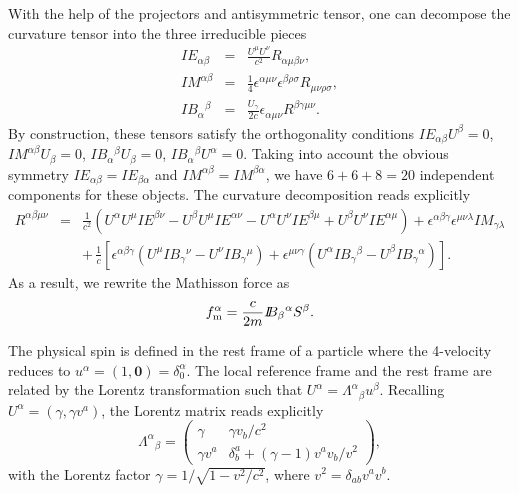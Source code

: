 \documentclass[preprint,showpacs,preprintnumbers,eqsecnum,amsmath,amssymb]{revtex4-1}
\newcommand{\dE}{I \! \! E}
\newcommand{\dB}{I \! \! B}
\newcommand{\dM}{I \! \! M}
\begin{document}
With the help of the projectors and antisymmetric tensor, one can
decompose the curvature tensor into the three irreducible pieces
\begin{eqnarray}
\dE_{\alpha\beta} &=& {\frac {U^\mu U^\nu}{c^2}}R_{\alpha\mu\beta\nu},\label{Eab}\\
\dM^{\alpha\beta} &=& {\frac 14}\epsilon^{\alpha\mu\nu}\epsilon^{\beta\rho\sigma}
R_{\mu\nu\rho\sigma},\label{Mab}\\
\dB_\alpha{}^\beta &=& {\frac {U_\gamma}{2c}}\epsilon_{\alpha\mu\nu}
R^{\beta\gamma\mu\nu}.\label{Bab}
\end{eqnarray}
By construction, these tensors satisfy the orthogonality conditions
$\dE_{\alpha\beta}U^\beta = 0$, $\dM^{\alpha\beta}U_\beta = 0$, $\dB_\alpha{}^\beta
U_\beta = 0$, $\dB_\alpha{}^\beta U^\alpha = 0$. Taking into account the
obvious symmetry $\dE_{\alpha\beta} = \dE_{\beta\alpha}$ and $\dM^{\alpha\beta}
= \dM^{\beta\alpha}$, we have $6+6+8=20$ independent components for these
objects. The curvature decomposition reads explicitly
\begin{eqnarray}
R^{\alpha\beta\mu\nu} &=& {\frac 1{c^2}}\left(U^\alpha U^\mu \dE^{\beta\nu}
- U^\beta U^\mu \dE^{\alpha\nu} - U^\alpha U^\nu \dE^{\beta\mu} + U^\beta U^\nu
\dE^{\alpha\mu}\right) + \epsilon^{\alpha\beta\gamma}\epsilon^{\mu\nu\lambda}
\dM_{\gamma\lambda}\nonumber\\
&& +\,{\frac 1c}\left[\epsilon^{\alpha\beta\gamma}\left(U^\mu\dB_\gamma{}^\nu
- U^\nu\dB_\gamma{}^\mu\right) + \epsilon^{\mu\nu\gamma}\left(U^\alpha
\dB_\gamma{}^\beta - U^\beta\dB_\gamma{}^\alpha\right)\right].
\end{eqnarray}
As a result, we rewrite the Mathisson force as
\begin{equation}
f_{\rm m}^\alpha = {\frac c{2m}}\dB_\beta{}^\alpha S^\beta.\label{fM}
\end{equation}

The physical spin is defined in the rest frame of a particle where the
4-velocity reduces to $u^\alpha = (1, \bm{0}) = \delta^\alpha_0$. The local
reference frame and the rest frame are related by the Lorentz transformation
such that $U^\alpha = \Lambda^\alpha{}_\beta u^\beta$. Recalling $U^\alpha =
(\gamma, \gamma v^a)$, the Lorentz matrix reads explicitly
\begin{equation}\label{Lab}
\Lambda^\alpha{}_\beta = \left(\begin{array}{c|c}\gamma & \gamma v_b/c^2 \\
\hline \gamma v^a & \delta^a_b + (\gamma - 1)v^av_b/v^2\end{array}\right),
\end{equation}
with the Lorentz factor $\gamma = 1/\sqrt{1 - v^2/c^2}$, where $v^2 =
\delta_{ab}v^av^b$.
\end{document}
